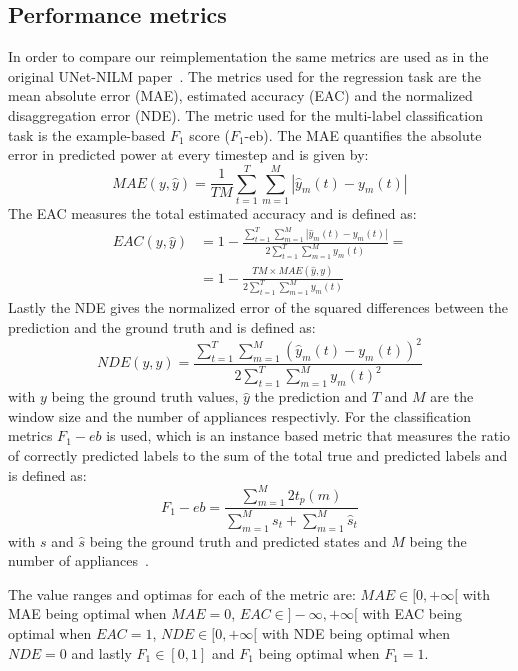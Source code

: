 \documentclass[sigconf]{acmart}
\begin{document}
\subsection{Performance metrics}
In order to compare our reimplementation the same metrics are used as in the original UNet-NILM paper~\cite{unetnilm}.
The metrics used for the regression task are the mean absolute error (MAE), estimated accuracy (EAC) and the normalized disaggregation error (NDE).
The metric used for the multi-label classification task is the example-based $F_1$ score ($F_1$-eb).
The MAE quantifies the absolute error in predicted power at every timestep and is given by:
\begin{equation}
  MAE(y, \hat{y}) = \frac{1}{TM}\sum_{t=1}^{T} \sum_{m=1}^{M} |\hat{y}_m(t) - y_m(t)|
\end{equation}
The EAC measures the total estimated accuracy and is defined as:
\begin{equation}\label{eq:eac}
  \begin{split}
    EAC(y, \hat{y}) &= 1 - \frac{\sum_{t=1}^{T} \sum_{m=1}^{M} |\hat{y}_m(t) - y_m(t)|}{2\sum_{t=1}^{T} \sum_{m=1}^{M} y_m(t)} = \\
                  &= 1 - \frac{TM \times MAE(\hat{y}, y)}{2\sum_{t=1}^{T} \sum_{m=1}^{M} y_m(t)}
  \end{split}
\end{equation}
Lastly the NDE gives the normalized error of the squared differences between the prediction and the ground truth and is defined as:
\begin{equation}\label{eq:nde}
  NDE(y, \hat{y}) = \frac{\sum_{t=1}^{T} \sum_{m=1}^{M} (\hat{y}_m(t) - y_m(t))^2}{2\sum_{t=1}^{T} \sum_{m=1}^{M} y_m(t)^2}
\end{equation}
with $y$ being the ground truth values, $\hat{y}$ the prediction and $T$ and $M$ are the window size and the number of 
appliances respectivly.
For the classification metrics $F_1-eb$ is used, which is an instance based metric that measures the ratio of correctly predicted
labels to the sum of the total true and predicted labels and is defined as:
\begin{equation}
  F_1-eb = \frac{\sum^M_{m=1} 2t_p(m)}{\sum^M_{m=1} s_t + \sum^M_{m=1} \hat{s}_t}
\end{equation}
with $s$ and $\hat{s}$ being the ground truth and predicted states and $M$ being the number of appliances~\cite{unetnilm}.

The value ranges and optimas for each of the metric are: 
$MAE \in [0, +\infty[$ with MAE being optimal when $MAE=0$,
$EAC \in ]-\infty, +\infty[$ with EAC being optimal when $EAC=1$, 
$NDE \in [0, +\infty[$ with NDE being optimal when $NDE=0$
and lastly $F_1 \in [0,1]$ and $F_1$ being optimal when $F_1=1$.
\end{document}
